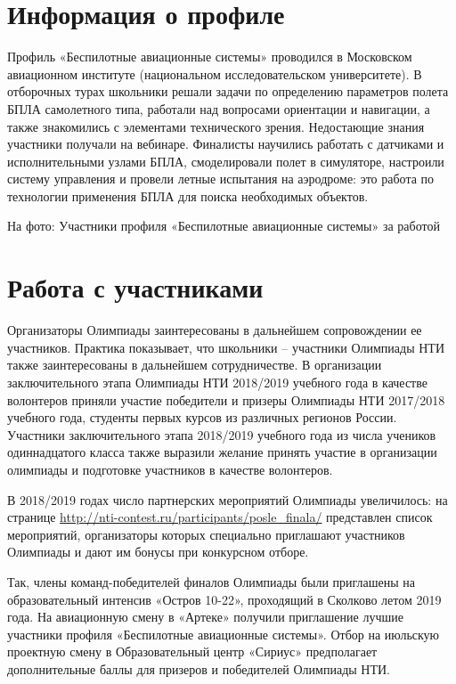 \section*{Информация о профиле}

Профиль «Беспилотные авиационные системы» проводился в Московском авиационном институте (национальном исследовательском университете). В отборочных турах школьники решали задачи по определению параметров полета БПЛА самолетного типа, работали над вопросами ориентации и навигации, а также знакомились с элементами технического зрения. Недостающие знания участники получали на вебинаре. Финалисты научились работать с датчиками и исполнительными узлами БПЛА, смоделировали полет в симуляторе, настроили систему управления и провели летные испытания на аэродроме: это работа по технологии применения БПЛА для поиска необходимых объектов.


\begin{center}
    На фото: Участники профиля «Беспилотные авиационные системы» за работой
\end{center}

\section*{Работа с участниками}

Организаторы Олимпиады заинтересованы в дальнейшем сопровождении ее участников. Практика показывает, что школьники  –  участники Олимпиады НТИ также заинтересованы в дальнейшем сотрудничестве. В организации заключительного этапа Олимпиады НТИ 2018/2019 учебного года в качестве волонтеров приняли участие победители и призеры Олимпиады НТИ 2017/2018 учебного года, студенты первых курсов из различных регионов России. Участники заключительного этапа 2018/2019 учебного года из числа учеников одиннадцатого класса также выразили желание принять участие в организации олимпиады и подготовке участников в качестве волонтеров.  

В 2018/2019 годах число партнерских мероприятий Олимпиады увеличилось: на странице \url{http://nti-contest.ru/participants/posle_finala/} представлен список мероприятий, организаторы которых специально приглашают участников Олимпиады и дают им бонусы при конкурсном отборе.

Так, члены команд-победителей финалов Олимпиады были приглашены на образовательный интенсив «Остров 10-22», проходящий в Сколково летом 2019 года.  На авиационную смену в «Артеке» получили приглашение лучшие участники профиля «Беспилотные авиационные системы». Отбор на июльскую проектную смену в Образовательный центр «Сириус» предполагает дополнительные баллы для призеров и победителей Олимпиады НТИ.

